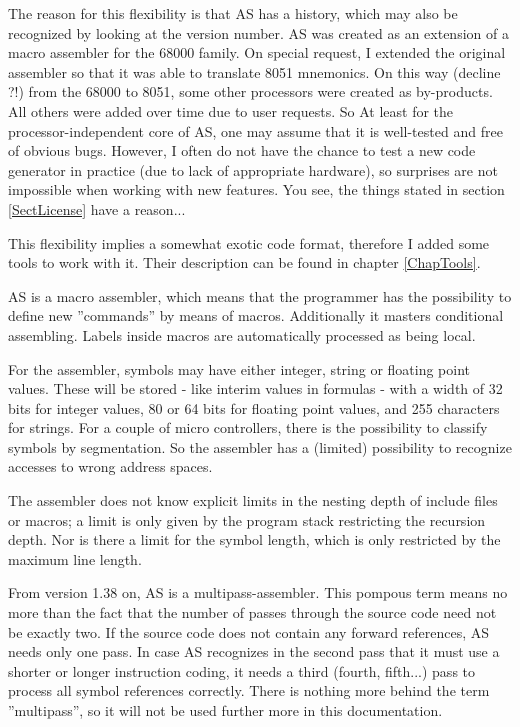 \documentclass[12pt,twoside]{report}
\begin{document}
The reason for this flexibility is that AS has a history, which may also
be recognized by looking at the version number. AS was created as an
extension of a macro assembler for the 68000 family. On special request, I
extended the original assembler so that it was able to translate 8051
mnemonics.  On this way (decline ?!) from the 68000 to 8051, some other
processors were created as by-products.  All others were added over time
due to user requests.  So At least for the processor-independent core of
AS, one may assume that it is well-tested and free of obvious bugs.
However, I often do not have the chance to test a new code generator in
practice (due to lack of appropriate hardware), so surprises are not
impossible when working with new features.  You see, the things stated in
section \ref{SectLicense} have a reason...

This flexibility implies a somewhat exotic code format, therefore I
added some tools to work with it. Their description can be found in
chapter \ref{ChapTools}.

AS is a macro assembler, which means that the programmer has the
possibility to define new ''commands'' by means of macros.
Additionally it masters conditional assembling.  Labels inside macros
are automatically processed as being local.

For the assembler, symbols may have either integer, string or floating
point values.  These will be stored - like interim values in formulas -
with a width of 32 bits for integer values, 80 or 64 bits for floating
point values, and 255 characters for strings.  For a couple of micro
controllers, there is the possibility to classify symbols by segmentation.
So the assembler has a (limited) possibility to recognize accesses to
wrong address spaces.

The assembler does not know explicit limits in the nesting depth of
include files or macros; a limit is only given by the program stack
restricting the recursion depth.  Nor is there a limit for the
symbol length, which is only restricted by the maximum line length.

From version 1.38 on, AS is a multipass-assembler.  This pompous term
means no more than the fact that the number of passes through the
source code need not be exactly two. If the source code does not
contain any forward references, AS needs only one pass.  In case AS
recognizes in the second pass that it must use a shorter or longer
instruction coding, it needs a third (fourth, fifth...) pass to
process all symbol references correctly. There is nothing more behind
the term ''multipass'', so it will not be used further more in this
documentation.
\end{document}
